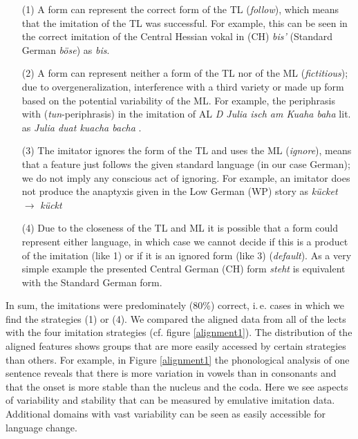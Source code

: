 \documentclass[output=paper]{LSP/langsci}
\begin{document}
\begin{itemize}
\item [(1)] A form can represent the correct form of the TL (\textit{follow}), which means that the imitation of the TL was successful.
 For example, this can be seen in the correct imitation of the Central Hessian vokal in (CH) \textit{bis’} (Standard German \textit{b\"ose})  as \textit{bis}.
 \item [(2)]  A form can represent neither a form of the TL nor of the ML (\textit{fictitious}); due to overgeneralization, interference with a third variety or made up form based on the potential variability of the ML. 
 For example, the periphrasis with  (\textit{tun}-periphrasis) in the imitation of AL \textit{D Julia isch am Kuaha baha} lit.  as \textit{Julia duat kuacha bacha} . 
  \item [(3)] The imitator ignores the form of the TL and uses the ML (\textit{ignore}), means that a feature just follows the given standard language (in our case German); we do not imply any conscious act of ignoring.
  For example, an imitator does not produce the anaptyxis given in the Low German (WP) story as \textit{k\"ucket} $\to$ \textit{k\"uckt}
   \item [(4)] Due to the closeness of the TL and ML it is possible that a form could represent either language, in which case we cannot decide if this is a product of the imitation (like 1) or if it is an ignored form (like 3) (\textit{default}). As a very simple example the presented Central German (CH) form \textit{steht}  is equivalent with the Standard German form.
 \end{itemize}
  
In sum, the imitations were predominately (80\%) correct, i.\,e. cases in which we find the strategies (1) or (4). We compared the aligned data from all of the lects with the four imitation strategies (cf. figure \ref{alignment1}). The distribution of the aligned features shows groups that are more easily accessed by certain strategies than others. For example, in Figure \ref{alignment1} the phonological analysis of one sentence reveals that there is more variation in vowels than in consonants and that the onset is more stable than the nucleus and the coda. Here we see aspects of variability and stability that can be measured by emulative imitation data. Additional domains with vast variability can be seen as easily accessible for language change.
\end{document}
